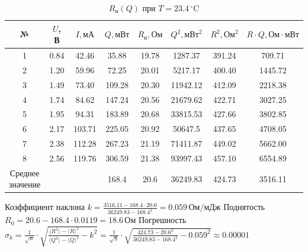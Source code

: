 \documentclass[a4paper, 10pt, twocolumn]{article}
\begin{document}
    \begin{table}[H] 
        \centering
        \begin{tabular}{|c|c|c|c|c|c|c|c|} \hline
        № & \(U\), В & \(I, \text{мА}\) & \( Q, \text{мВт} \) & \(R_\text{н}, \text{Ом}\) & \(Q^2, \text{мВт}^2 \) & \(R^2, \text{Ом}^2\) & \(R \cdot Q, \text{Ом}\cdot\text{мВт}\) \\ \hline
        1 & 0.84 & 42.46  & 35.88  & 19.78 & 1287.37 & 391.24 & 709.71  \\ \hline
        2 & 1.20 & 59.96  & 72.25  & 20.01 & 5217.17 & 400.40 & 1445.72 \\ \hline
        3 & 1.49 & 73.40  & 109.28 & 20.30 & 11942.12 & 412.09 & 2218.38 \\ \hline
        4 & 1.74 & 84.62  & 147.24 & 20.56 & 21679.62 & 422.71 & 3027.25 \\ \hline
        5 & 1.95 & 94.31  & 183.89 & 20.68 & 33815.53 & 427.66 & 3802.85 \\ \hline
        6 & 2.17 & 103.71 & 225.05 & 20.92 & 50647.5 & 437.65 & 4708.05 \\ \hline
        7 & 2.38 & 112.28 & 267.23 & 21.19 & 71411.87 & 449.02 & 5662.00 \\ \hline
        8 & 2.56 & 119.76 & 306.59 & 21.38 & 93997.43 & 457.10 & 6554.89 \\ \hline
        \shortstack{Среднее \\ значение} & & & 168.4 & 20.6 & 36249.83 & 424.73 & 3516.11 \\ \hline
        \end{tabular}
        \caption{\(R_\text{н}(Q)\) при \(T = 23.4 \, ^\circ\text{C}\)}
    \end{table}
    Коэффициент наклона $k = \frac{3516.11 - 168.4 \cdot 20.6}{36249.83 - 168.4^2} = 0.059 \, \text{Ом}/\text{мДж}$ \newline
    Поднятость $R_0 = 20.6 - 168.4 \cdot 0.0119 = 18.6 \, \text{Ом}$
    Погрешность $\sigma_k = \frac{1}{\sqrt{n}}\cdot \sqrt{\frac{\langle R^2 \rangle - \langle R \rangle ^2}{\langle Q^2 \rangle - \langle Q \rangle ^2} - k^2} = 
    \frac{1}{\sqrt{8}}\cdot\sqrt{\frac{424.73 - 20.6^2}{36249.83 - 168.4^2} - 0.059^2} \approx 0.00001 $
\end{document}
